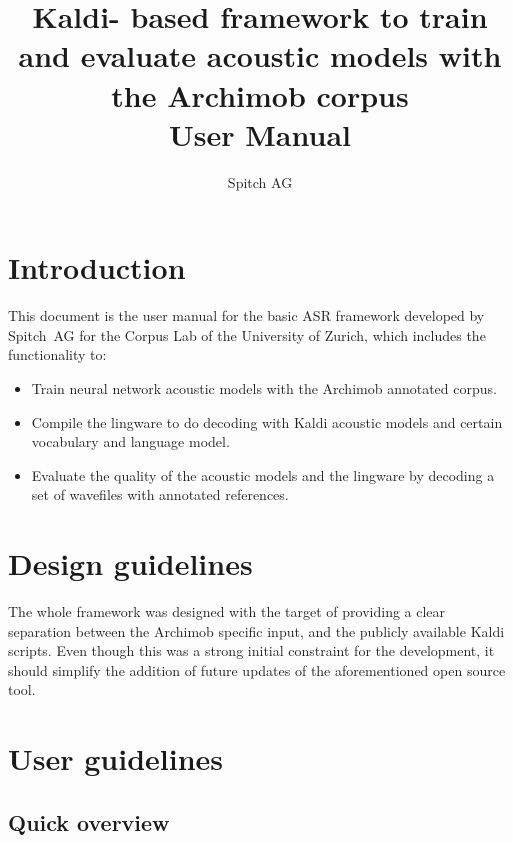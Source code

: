 \documentclass[11pt,a4paper,titlepage,twoside]{article}
\author{Spitch AG}
\title{Kaldi-
based framework to train and evaluate acoustic models with the Archimob corpus \\ User Manual}
\begin{document}
\maketitle

\cleardoublepage

\tableofcontents

\cleardoublepage

{}

\section{Introduction}
\label{sec:introduction}

This document is the user manual for the basic ASR framework developed by Spitch~AG for the Corpus Lab of the University of Zurich, which includes the functionality to:

\begin{itemize}
\item Train neural network acoustic models with the Archimob annotated corpus.
\item Compile the lingware to do decoding with Kaldi acoustic models and certain vocabulary and language model.
\item Evaluate the quality of the acoustic models and the lingware by decoding a set of wavefiles with annotated references.
\end{itemize}

\section{Design guidelines}
\label{sec:design-guidelines}

The whole framework was designed with the target of providing a clear separation between the Archimob specific input, and the publicly available Kaldi scripts. Even though this was a strong initial constraint for the development, it should simplify the addition of future updates of the aforementioned open source tool.

\section{User guidelines}
\label{sec:user-guidelines}

\subsection{Quick overview}
\label{sec:quick-overview}
\end{document}
